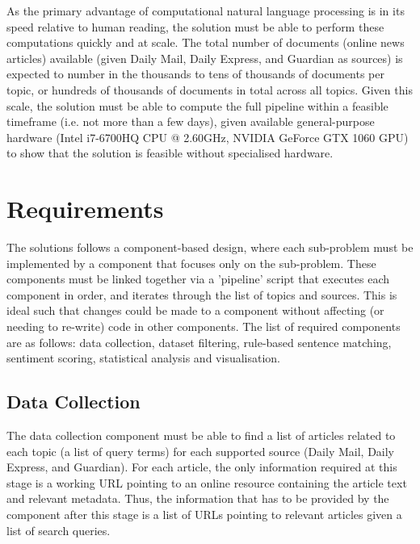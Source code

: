 \documentclass{report}
\begin{document}
As the primary advantage of computational natural language processing is in its speed relative to human reading, the solution must be able to perform these computations quickly and at scale.
The total number of documents (online news articles) available (given Daily Mail, Daily Express, and Guardian as sources) is expected to number in the thousands to tens of thousands of documents per topic, or hundreds of thousands of documents in total across all topics.
Given this scale, the solution must be able to compute the full pipeline within a feasible timeframe (i.e. not more than a few days), given available general-purpose hardware (Intel i7-6700HQ CPU @ 2.60GHz, NVIDIA GeForce GTX 1060 GPU) to show that the solution is feasible without specialised hardware.

\section{Requirements} \label{Requirements}

The solutions follows a component-based design, where each sub-problem must be implemented by a component that focuses only on the sub-problem.
These components must be linked together via a 'pipeline' script that executes each component in order, and iterates through the list of topics and sources.
This is ideal such that changes could be made to a component without affecting (or needing to re-write) code in other components.
The list of required components are as follows: data collection, dataset filtering, rule-based sentence matching, sentiment scoring, statistical analysis and visualisation.


\subsection{Data Collection} \label{req-data-collection}  %

The data collection component must be able to find a list of articles related to each topic (a list of query terms) for each supported source (Daily Mail, Daily Express, and Guardian).
For each article, the only information required at this stage is a working URL pointing to an online resource containing the article text and relevant metadata.
Thus, the information that has to be provided by the component after this stage is a list of URLs pointing to relevant articles given a list of search queries.
\end{document}
